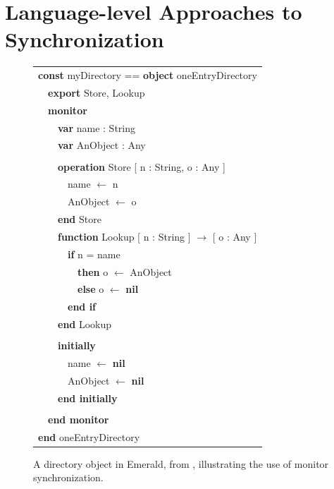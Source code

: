 \documentclass[12pt]{article}
\newcommand{\sis}{\linespread{1.0}\setlength{\baselineskip}{0.8\baselineskip}}
\begin{document}
\section{Language-level Approaches to \\Synchronization}
\begin{figure}
{\it\sis%
\begin{tabular}{l}\sis%
{\bf const} myDirectory == {\bf object} oneEntryDirectory\\
~~{\bf export} Store, Lookup\\
~~{\bf monitor}\\
~~~~{\bf var} name : String\\
~~~~{\bf var} AnObject : Any\\
\\
~~~~{\bf operation} Store [ n : String, o : Any ]\\
~~~~~~name $\gets$ n\\
~~~~~~AnObject $\gets$ o\\
~~~~{\bf end} Store
\\
~~~~{\bf function} Lookup [ n : String ] $\to$ [ o : Any ]\\
~~~~~~{\bf if} n = name\\
~~~~~~~~{\bf then} o $\gets$ AnObject\\
~~~~~~~~{\bf else} o $\gets$ {\bf nil}\\
~~~~~~{\bf end if}\\
~~~~{\bf end} Lookup\\
\\
~~~~{\bf initially}\\
~~~~~~name $\gets$ {\bf nil}\\
~~~~~~AnObject $\gets$ {\bf nil}\\
~~~~{\bf end initially}\\
\\
~~{\bf end monitor}\\
{\bf end} oneEntryDirectory
\end{tabular}
}
\caption{A directory object in Emerald, from \cite{BlackHuJuLe86},
  illustrating the use of monitor synchronization.}
\label{fig:emerald-dir}
\end{figure}
\end{document}

